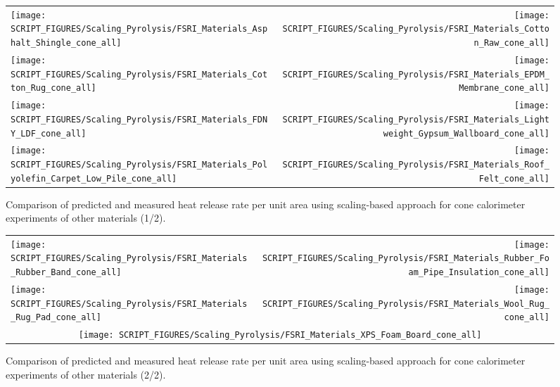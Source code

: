 \begin{figure}[p]
\begin{tabular*}{\textwidth}{l@{\extracolsep{\fill}}r}
\texttt{[image: SCRIPT\_FIGURES/Scaling\_Pyrolysis/FSRI\_Materials\_Asphalt\_Shingle\_cone\_all]} &
\texttt{[image: SCRIPT\_FIGURES/Scaling\_Pyrolysis/FSRI\_Materials\_Cotton\_Raw\_cone\_all]} \\
\texttt{[image: SCRIPT\_FIGURES/Scaling\_Pyrolysis/FSRI\_Materials\_Cotton\_Rug\_cone\_all]} &
\texttt{[image: SCRIPT\_FIGURES/Scaling\_Pyrolysis/FSRI\_Materials\_EPDM\_Membrane\_cone\_all]} \\
\texttt{[image: SCRIPT\_FIGURES/Scaling\_Pyrolysis/FSRI\_Materials\_FDNY\_LDF\_cone\_all]} &
\texttt{[image: SCRIPT\_FIGURES/Scaling\_Pyrolysis/FSRI\_Materials\_Lightweight\_Gypsum\_Wallboard\_cone\_all]} \\
\texttt{[image: SCRIPT\_FIGURES/Scaling\_Pyrolysis/FSRI\_Materials\_Polyolefin\_Carpet\_Low\_Pile\_cone\_all]} &
\texttt{[image: SCRIPT\_FIGURES/Scaling\_Pyrolysis/FSRI\_Materials\_Roof\_Felt\_cone\_all]} \\
\end{tabular*}
\caption[Heat release rate per unit area of FSRI materials using scaling model, other materials]
{Comparison of predicted and measured heat release rate per unit area using scaling-based approach for cone calorimeter experiments of other materials (1/2).}
\label{FSRI_Materials_others1}
\end{figure}

\begin{figure}[p]
\begin{tabular*}{\textwidth}{l@{\extracolsep{\fill}}r}
\texttt{[image: SCRIPT\_FIGURES/Scaling\_Pyrolysis/FSRI\_Materials\_Rubber\_Band\_cone\_all]} &
\texttt{[image: SCRIPT\_FIGURES/Scaling\_Pyrolysis/FSRI\_Materials\_Rubber\_Foam\_Pipe\_Insulation\_cone\_all]} \\
\texttt{[image: SCRIPT\_FIGURES/Scaling\_Pyrolysis/FSRI\_Materials\_Rug\_Pad\_cone\_all]} &
\texttt{[image: SCRIPT\_FIGURES/Scaling\_Pyrolysis/FSRI\_Materials\_Wool\_Rug\_cone\_all]} \\
\multicolumn{2}{c}{\texttt{[image: SCRIPT\_FIGURES/Scaling\_Pyrolysis/FSRI\_Materials\_XPS\_Foam\_Board\_cone\_all]}}
\end{tabular*}
\caption[Heat release rate per unit area of FSRI materials using scaling model, other materials]
{Comparison of predicted and measured heat release rate per unit area using scaling-based approach for cone calorimeter experiments of other materials (2/2).}
\label{FSRI_Materials_others2}
\end{figure}

